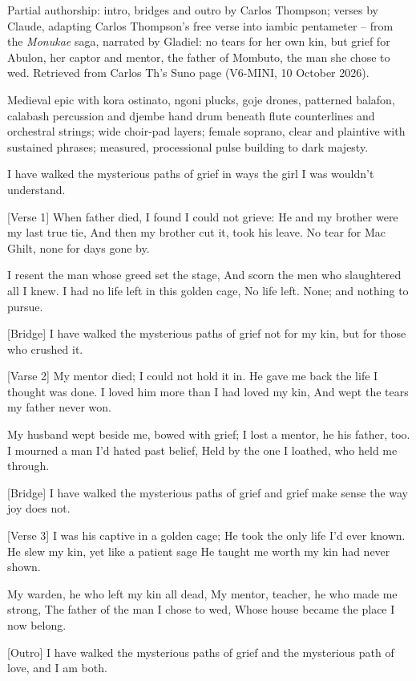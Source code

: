 \begin{notes}
Partial authorship: intro, bridges and outro by Carlos Thompson; verses by Claude, adapting Carlos Thompson's free verse into iambic pentameter -- from the \emph{Monukae} saga, narrated by Gladiel: no tears for her own kin, but grief for Abulon, her captor and mentor, the father of Mombuto, the man she chose to wed. Retrieved from Carlos Th's Suno page (V6-MINI, 10 October 2026).
\end{notes}
\begin{style}
Medieval epic with kora ostinato, ngoni plucks, goje drones, patterned balafon, calabash percussion and djembe hand drum beneath flute counterlines and orchestral strings; wide choir-pad layers; female soprano, clear and plaintive with sustained phrases; measured, processional pulse building to dark majesty.
\end{style}
\begin{lyrics}
[Intro]
I have walked the mysterious paths of grief
in ways the girl I was wouldn't understand.

[Verse 1]
When father died, I found I could not grieve:
He and my brother were my last true tie,
And then my brother cut it, took his leave.
No tear for Mac Ghilt, none for days gone by.

I resent the man whose greed set the stage,
And scorn the men who slaughtered all I knew.
I had no life left in this golden cage,
No life left. None; and nothing to pursue.

[Bridge]
I have walked the mysterious paths of grief
not for my kin, but for those who crushed it.

[Varse 2]
My mentor died; I could not hold it in.
He gave me back the life I thought was done.
I loved him more than I had loved my kin,
And wept the tears my father never won.

My husband wept beside me, bowed with grief;
I lost a mentor, he his father, too.
I mourned a man I’d hated past belief,
Held by the one I loathed, who held me through.

[Bridge]
I have walked the mysterious paths of grief
and grief make sense the way joy does not.

[Verse 3]
I was his captive in a golden cage;
He took the only life I’d ever known.
He slew my kin, yet like a patient sage
He taught me worth my kin had never shown.

My warden, he who left my kin all dead,
My mentor, teacher, he who made me strong,
The father of the man I chose to wed,
Whose house became the place I now belong.

[Outro]
I have walked the mysterious paths of grief
and the mysterious path of love,
and I am both.
\end{lyrics}


